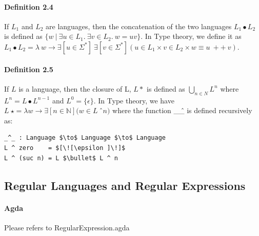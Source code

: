 \documentclass[twoside,openright,final]{bhamthesis}
\begin{document}
\paragraph{Definition 2.4} If \(L_1\) and \(L_2\) are languages, then
the concatenation of the two languages \(L_1\bullet L_2\) is defined
as \(\{w\  |\  \exists u\in L_1.\ \exists v\in L_2.\ w = uv\}\). In
Type theory, we define it as \(L_1\bullet L_2 = \lambda\ w \to \exists[
u \in \Sigma^* ]\ \exists[ v \in \Sigma^* ] ( u \in L_1 \times v \in L_2 \times w \equiv u\ ++\ v ) \).

\paragraph{Definition 2.5} If \(L\) is a language, then the closure of
L, \(L\ast\) is defined as \( \bigcup_{n \in N} L^n \) where
\( L^n = L\bullet L^{n - 1} \) and \(L^0 = \{\epsilon\}\). In Type
theory, we have \(L\ \star = \lambda w \to \exists [ n \in \mathbb{N}
]( w \in L\ \)\^\ \(n)\) where the function \_\^ \_ is defined
recursively as: 
\begin{lstlisting}[mathescape=true,xleftmargin=.3\textwidth,aboveskip=0pt,belowskip=0pt]
_^_ : Language $\to$ Language $\to$ Language
L ^ zero    = $[\![\epsilon ]\!]$
L ^ (suc n) = L $\bullet$ L ^ n
\end{lstlisting}

\subsection{Regular Languages and Regular Expressions}
\paragraph{Agda} Please refers to RegularExpression.agda
\end{document}
